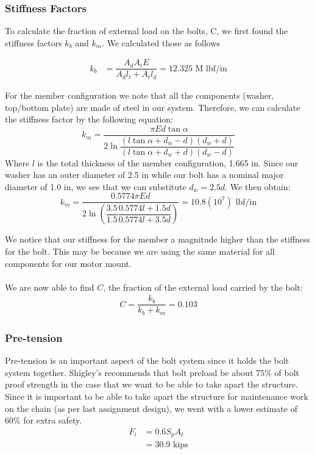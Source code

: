 \documentclass[letterpaper,12pt]{article}
\begin{document}
\subsubsection{Stiffness Factors}
To calculate the fraction of external load on the bolts, C, we first found the stiffness factors $k_{b}$ and $k_{m}$. We calculated those as follows

\begin{align*}
    k _ { b } &= \dfrac { A _ { d } A _ { t } E } { A _ { d } l _ { t } + A _ { t } l _ { d } }
    = 12.325 \text{ M lbf/in} 
\end{align*}

\noindent For the member configuration we note that all the components (washer, top/bottom plate) are made of steel in our system. Therefore, we can calculate the stiffness factor by the following equation:
\begin{equation*}
    k _ { m } = \dfrac { \pi E d \tan \alpha } { 2 \ln \dfrac { \left( l \tan \alpha + d _ { w } - d \right) \left( d _ { w } + d \right) } { \left( l \tan \alpha + d _ { w } + d \right) \left( d _ { w } - d \right) } }
\end{equation*}
Where $l$ is the total thickness of the member configuration, 1.665 in. Since our washer has an outer diameter of 2.5 in while our bolt has a nominal major diameter of 1.0 in, we see that we can substitute $d_w = 2.5d$. We then obtain:
\begin{equation*}
    k _ { m } = \dfrac { 0.5774 \pi E d } { 2 \ln \left( \dfrac{3.5}{1.5} \dfrac { 0.5774 l + 1.5 d } { 0.5774 l + 3.5 d } \right) } = 10.8(10^7) \text{ lbf/in}
\end{equation*}

\noindent We notice that our stiffness for the member a magnitude higher than the stiffness for the bolt. This may be because we are using the same material for all components for our motor mount.\\\\
We are now able to find $C$, the fraction of the external load carried by the bolt:
\begin{align*}
    C = \dfrac { k _ { b } } { k _ { b } + k _ { m } } = 0.103
\end{align*}

\subsubsection{Pre-tension}
Pre-tension is an important aspect of the bolt system since it holds the bolt system together. Shigley's recommends that bolt preload be about 75\% of bolt proof strength in the case that we want to be able to take apart the structure. Since it is important to be able to take apart the structure for maintenance work on the chain (as per last assignment design), we went with a lower estimate of 60\% for extra safety.
\begin{align*}
    F_i &= 0.6S_pA_t\\
    &= 30.9 \text{ kips}
\end{align*}
\end{document}
